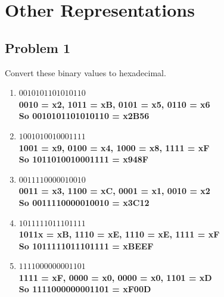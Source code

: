 \documentclass{article}
\begin{document}
\section*{Other Representations}
\subsection*{Problem 1}
Convert these binary values to hexadecimal.
\begin{enumerate}[label=\alph*.]
    \item $0010 1011 0101 0110$\\
    \textbf{0010 = x2, 1011 = xB, 0101 = x5, 0110 = x6\\
            So 0010101101010110 = x2B56}
    \item $1001 0100 1000 1111$\\
    \textbf{1001 = x9, 0100 = x4, 1000 = x8, 1111 = xF\\
            So 1011010010001111 = x948F}
    \item $0011 1100 0001 0010$\\
    \textbf{0011 = x3, 1100 = xC, 0001 = x1, 0010 = x2\\
            So 0011110000010010 = x3C12}
    \item $1011 1110 1110 1111$\\
    \textbf{1011x = xB, 1110 = xE, 1110 = xE, 1111 = xF\\
            So 1011111011101111 = xBEEF}
    \item $1111 0000 0000 1101$\\
    \textbf{1111 = xF, 0000 = x0, 0000 = x0, 1101 = xD\\
            So 1111000000001101 = xF00D}
\end{enumerate}
\end{document}
